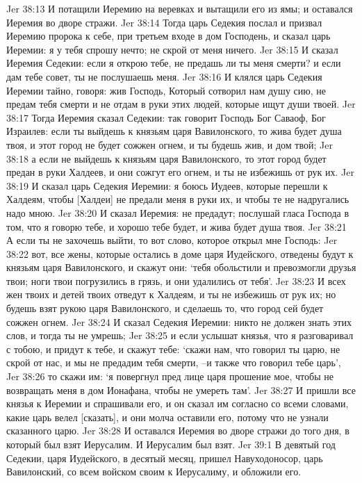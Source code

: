 Jer 38:13  И потащили Иеремию на веревках и вытащили его из ямы; и оставался Иеремия во дворе стражи.
Jer 38:14  Тогда царь Седекия послал и призвал Иеремию пророка к себе, при третьем входе в дом Господень, и сказал царь Иеремии: я у тебя спрошу нечто; не скрой от меня ничего.
Jer 38:15  И сказал Иеремия Седекии: если я открою тебе, не предашь ли ты меня смерти? и если дам тебе совет, ты не послушаешь меня.
Jer 38:16  И клялся царь Седекия Иеремии тайно, говоря: жив Господь, Который сотворил нам душу сию, не предам тебя смерти и не отдам в руки этих людей, которые ищут души твоей.
Jer 38:17  Тогда Иеремия сказал Седекии: так говорит Господь Бог Саваоф, Бог Израилев: если ты выйдешь к князьям царя Вавилонского, то жива будет душа твоя, и этот город не будет сожжен огнем, и ты будешь жив, и дом твой;
Jer 38:18  а если не выйдешь к князьям царя Вавилонского, то этот город будет предан в руки Халдеев, и они сожгут его огнем, и ты не избежишь от рук их.
Jer 38:19  И сказал царь Седекия Иеремии: я боюсь Иудеев, которые перешли к Халдеям, чтобы [Халдеи] не предали меня в руки их, и чтобы те не надругались надо мною.
Jer 38:20  И сказал Иеремия: не предадут; послушай гласа Господа в том, что я говорю тебе, и хорошо тебе будет, и жива будет душа твоя.
Jer 38:21  А если ты не захочешь выйти, то вот слово, которое открыл мне Господь:
Jer 38:22  вот, все жены, которые остались в доме царя Иудейского, отведены будут к князьям царя Вавилонского, и скажут они: `тебя обольстили и превозмогли друзья твои; ноги твои погрузились в грязь, и они удалились от тебя'.
Jer 38:23  И всех жен твоих и детей твоих отведут к Халдеям, и ты не избежишь от рук их; но будешь взят рукою царя Вавилонского, и сделаешь то, что город сей будет сожжен огнем.
Jer 38:24  И сказал Седекия Иеремии: никто не должен знать этих слов, и тогда ты не умрешь;
Jer 38:25  и если услышат князья, что я разговаривал с тобою, и придут к тебе, и скажут тебе: `скажи нам, что говорил ты царю, не скрой от нас, и мы не предадим тебя смерти, --и также что говорил тебе царь',
Jer 38:26  то скажи им: `я повергнул пред лице царя прошение мое, чтобы не возвращать меня в дом Ионафана, чтобы не умереть там'.
Jer 38:27  И пришли все князья к Иеремии и спрашивали его, и он сказал им согласно со всеми словами, какие царь велел [сказать], и они молча оставили его, потому что не узнали сказанного царю.
Jer 38:28  И оставался Иеремия во дворе стражи до того дня, в который был взят Иерусалим. И Иерусалим был взят.
Jer 39:1  В девятый год Седекии, царя Иудейского, в десятый месяц, пришел Навуходоносор, царь Вавилонский, со всем войском своим к Иерусалиму, и обложили его.
